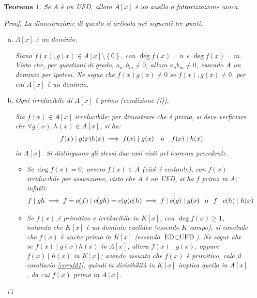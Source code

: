 \documentclass[12pt]{scrartcl}
\theoremstyle{style}
\newtheorem{teorema}{Teorema}[section]
\numberwithin{equation}{subsection}
\begin{document}
\begin{teorema}\label{th1an}
	Se $A$ \`e un UFD, allora $A[x]$ \`e un anello a fattorizzazione unica.
	\begin{proof}
		La dimostrazione di questo si articola nei seguenti tre punti.
		\begin{enumerate}[(a).]
			\item $A[x]$ \`e un dominio.

				Siano $f(x), g(x) \in A[x] \setminus\left\{ 0 \right\} $, con $\operatorname{deg} f(x) = n$ e $\operatorname{deg} f(x) = m$.
				Visto che, per questioni di grado, $a_n,b_m\neq 0$, allora $a_nb_m \neq 0$, essendo $A$ un dominio per ipotesi.
				Ne segue che $f(x) g(x) \neq 0$ se $f(x),g(x) \neq 0$, per cui $A[x]$ \`e un dominio.
			\item Ogni irriducibile di $A[x]$ \`e primo (condizione (i)).

				Sia $f(x) \in A[x]$ irriducibile; per dimostrare che \`e primo, si deve verficiare che $\forall g(x),h(x) \in A[x]$, si ha:
				\[
				f(x)  \mid g(x) h(x) \implies f(x)  \mid g(x) \hspace{.25cm} \text{ o } \hspace{.25cm} f(x)  \mid h(x)
				\] 
				in $A[x]$.
				Si distinguono gli stessi due casi visti nel teorema precedente.
				\begin{itemize}
					\item Se $\operatorname{deg} f(x) = 0 $, ovvero $f(x)  \in A$ (cio\`e \`e costante), con $f(x)$ irriducibile per assunzione, visto che $A$ \`e un UFD, si ha $f$ primo in $A$; infatti:
						\[
						f \mid gh \implies f=c(f)  \mid c(gh) = c(g) c(h) \implies f \mid c(g)  \mid g(x) \hspace{.15cm} \text{ o }\hspace{.15cm} f  \mid c(h)  \mid h(x)
						\] 
					\item Se $f(x)$ \`e primitivo e irriducibile in $K[x]$, con $\operatorname{deg} f(x) \ge 1$, notando che $K[x]$ \`e un dominio euclideo (essendo $K$ campo), si conclude che $f(x)$ \`e anche primo in $K[x]$ (essendo $\text{ED}\subset \text{UFD}$).
						Ne segue che se $f(x)  \mid g(x) h(x)$ in $A[x]$, allora $f(x)  \mid g(x)$, oppure $f(x)  \mid h(x)$ in $K[x]$; avendo assunto che $f(x)$ \`e primitivo, vale il corollario \ref{corufd1}, quindi la divisibilit\`a in $K[x]$ implica quella in $A[x]$, da cui $f(x)$ primo in $A[x]$.
						
				\end{itemize}




\end{enumerate}
\end{proof}
\end{teorema}
\end{document}

